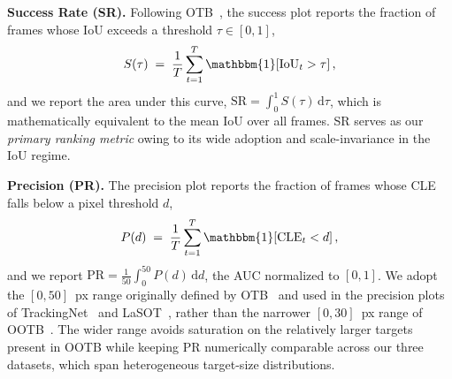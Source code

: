 \documentclass{article}
\begin{document}
\noindent\textbf{Success Rate (SR).} Following OTB~\citep{wu2015otb}, the
success plot reports the fraction of frames whose IoU exceeds a threshold $\tau
\in [0, 1]$,
\begin{equation}
S(\tau) \;=\; \frac{1}{T} \sum_{t=1}^{T} \mathbbm{1}\!\left[\mathrm{IoU}_t > \tau\right],
\end{equation}
and we report the area under this curve, $\mathrm{SR} = \int_0^1 S(\tau)\,
\mathrm{d}\tau$, which is mathematically equivalent to the mean IoU over all
frames. SR serves as our \emph{primary ranking metric} owing to its wide
adoption and scale-invariance in the IoU regime.
 
\noindent\textbf{Precision (PR).} The precision plot reports the fraction of
frames whose CLE falls below a pixel threshold $d$,
\begin{equation}
P(d) \;=\; \frac{1}{T} \sum_{t=1}^{T} \mathbbm{1}\!\left[\mathrm{CLE}_t < d\right],
\end{equation}
and we report $\mathrm{PR} = \frac{1}{50} \int_0^{50} P(d)\, \mathrm{d}d$, the
AUC normalized to $[0,1]$. We adopt the $[0, 50]$~px range originally defined by
OTB~\citep{wu2015otb} and used in the precision plots of
TrackingNet~\citep{muller2018trackingnet} and LaSOT~\citep{fan2019lasot}, rather
than the narrower $[0, 30]$~px range of OOTB~\citep{chen2024ootb}. The wider
range avoids saturation on the relatively larger targets present in OOTB while
keeping PR numerically comparable across our three datasets, which span
heterogeneous target-size distributions.
 
\end{document}

